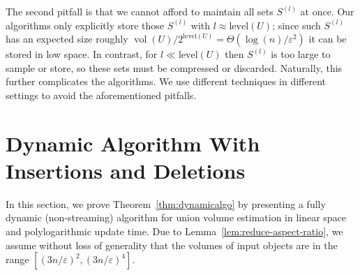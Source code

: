 \documentclass[11pt]{article}
\def\vol{\operatorname{vol}}		%
\newcommand{\level}{\mathrm{level}}
\newcommand{\eps}{\varepsilon}
\begin{document}
%
The second pitfall is that we cannot afford to maintain all sets $S^{(l)}$ at once. Our algorithms only explicitly store those $S^{(l)}$ with $l \approx \level(U)$; since such $S^{(l)}$ has an expected size roughly $\vol(U)/2^{\level(U)} = \Theta(\log(n)/\eps^2)$ it can be stored in low space. In contrast, for $l \ll \level(U)$ then $S^{(l)}$ is too large to sample or store, so these sets must be compressed or discarded. Naturally, this further complicates the algorithms. We use different techniques in different settings to avoid the aforementioned pitfalls.
%
\section{Dynamic Algorithm With Insertions and Deletions}
\label{sec:dynamic}
%
In this section, we prove Theorem~\ref{thm:dynamicalgo} by presenting a fully dynamic (non-streaming) algorithm for union volume estimation in linear space and polylogarithmic update time. Due to Lemma~\ref{lem:reduce-aspect-ratio}, we assume without loss of generality that the volumes of input objects are in the range $[(3n/\eps)^2, (3n/\eps)^4]$.
%
\end{document}
